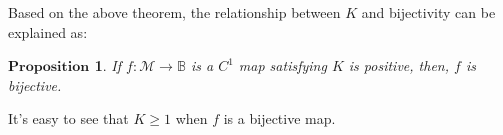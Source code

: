 \documentclass{article}
\newtheorem{proposition}[defn]{$\mathbf{Proposition}$}
\begin{document}

Based on the above theorem, the relationship between $K$ and bijectivity can be explained as:
\begin{proposition}\label{bijective_proposition}
    If $f:\mathcal{M} \rightarrow \mathbb B$ is a $C^1$ map satisfying $K$ is positive, then, $f$ is bijective.
\end{proposition}
It's easy to see that $K\geq 1$ when $f$ is a bijective map. %




\end{document}
